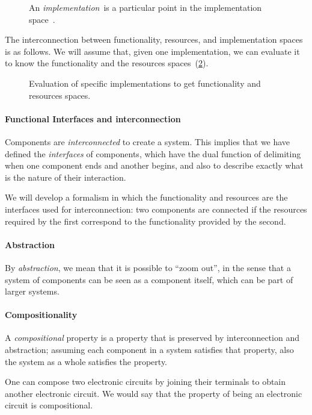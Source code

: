 \begin{figure}[h!]
    \centering
    \caption{An \emph{implementation}~\imp is a particular point in the implementation space~\impsp.}
    \label{fig:impspace}
\end{figure}

The interconnection between functionality, resources, and implementation spaces is as follows.
We will assume that, given one implementation, we can evaluate it to know the functionality and the resources spaces~(\cref{fig:FIR}).

\begin{figure}[h!]
    \centering
    \caption{Evaluation of specific implementations to get functionality and resources spaces.\label{fig:FIR}}
\end{figure}

\paragraph{Functional Interfaces and interconnection}
Components are \emph{interconnected} to create a system.
This implies that we have defined the \emph{interfaces} of components, which have the dual function of delimiting when one component ends and another begins, and also to describe exactly what is the nature of their interaction.

We will develop a formalism in which the functionality and resources are the interfaces used for interconnection: two components are connected if the resources required by the first correspond to the functionality provided by the second.

\paragraph{Abstraction}
By \emph{abstraction}, we mean that it is possible to ``zoom out'', in the sense that a system of components can be seen as a component itself, which can be part of larger systems.

\paragraph{Compositionality}
A \emph{compositional} property is a property that is preserved by interconnection and abstraction; assuming each component in a system satisfies that property, also the system as a whole satisfies the property.

\begin{example}
    One can compose two electronic circuits by joining their terminals to obtain another electronic circuit.
    We would say that the property of being an electronic circuit is compositional.
\end{example}


